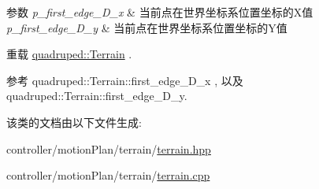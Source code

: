 \begin{DoxyParams}{参数}
{\em p\+\_\+first\+\_\+edge\+\_\+\+D\+\_\+x} & 当前点在世界坐标系位置坐标的\+X值 \\
\hline
{\em p\+\_\+first\+\_\+edge\+\_\+\+D\+\_\+y} & 当前点在世界坐标系位置坐标的\+Y值 \\
\hline
\end{DoxyParams}


重载 \hyperlink{classquadruped_1_1Terrain}{quadruped\+::\+Terrain} .



参考 quadruped\+::\+Terrain\+::first\+\_\+edge\+\_\+\+D\+\_\+x , 以及 quadruped\+::\+Terrain\+::first\+\_\+edge\+\_\+\+D\+\_\+y.



该类的文档由以下文件生成\+:\begin{DoxyCompactItemize}
\item 
controller/motion\+Plan/terrain/\hyperlink{terrain_8hpp}{terrain.\+hpp}\item 
controller/motion\+Plan/terrain/\hyperlink{terrain_8cpp}{terrain.\+cpp}\end{DoxyCompactItemize}
